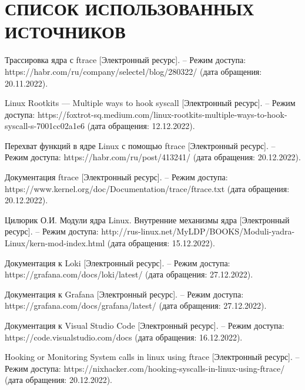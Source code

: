 \section*{СПИСОК ИСПОЛЬЗОВАННЫХ ИСТОЧНИКОВ}

\begingroup
\renewcommand{\section}[2]{}
\begin{thebibliography}{}
	
	Трассировка ядра с ftrace [Электронный ресурс]. -- Режим доступа: https://habr.com/ru/company/selectel/blog/280322/ (дата обращения: 20.11.2022).
	
	Linux Rootkits — Multiple ways to hook syscall [Электронный ресурс]. -- Режим доступа: https://foxtrot-sq.medium.com/linux-rootkits-multiple-ways-to-hook-syscall-s-7001cc02a1e6 (дата обращения: 12.12.2022).
	
	Перехват функций в ядре Linux с помощью ftrace [Электронный ресурс]. -- Режим доступа: https://habr.com/ru/post/413241/ (дата обращения: 20.12.2022).
	
	Документация ftrace [Электронный ресурс]. -- Режим доступа: https://www.kernel.org/doc/Documentation/trace/ftrace.txt  (дата обращения: 20.12.2022).
	
	Цилюрик О.И. Модули ядра Linux. Внутренние механизмы ядра [Электронный ресурс]. -- Режим доступа: http://rus-linux.net/MyLDP/BOOKS/Moduli-yadra-Linux/kern-mod-index.html (дата обращения: 15.12.2022).
	
	Документация к Loki [Электронный ресурс]. -- Режим доступа: https://grafana.com/docs/loki/latest/ (дата обращения: 27.12.2022).
	
	Документация к Grafana [Электронный ресурс]. -- Режим доступа: https://grafana.com/docs/grafana/latest/ (дата обращения: 27.12.2022).
	
	Документация к Visual Studio Code [Электронный ресурс]. -- Режим доступа: https://code.visualstudio.com/docs (дата обращения: 16.12.2022).
	
	Hooking or Monitoring System calls in linux using ftrace [Электронный ресурс]. -- Режим доступа: https://nixhacker.com/hooking-syscalls-in-linux-using-ftrace/ (дата обращения: 20.12.2022).
	
\end{thebibliography}
\endgroup

\pagebreak